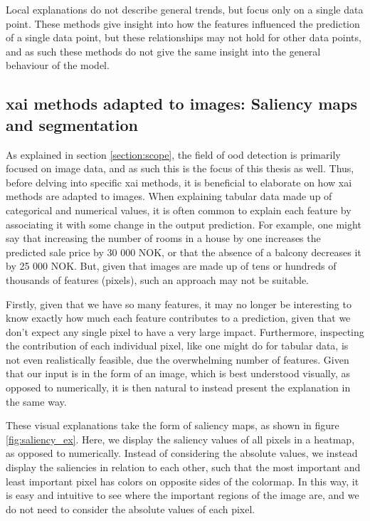 \documentclass[UKenglish]{uiomasterthesis} %
\theoremstyle{definition}
\begin{document}
Local explanations do not describe general trends, but focus only on a single data point. These methods give insight into how the features influenced the prediction of a single data point, but these relationships may not hold for other data points, and as such these methods do not give the same insight into the general behaviour of the model.

%

\subsection{\ac{xai} methods adapted to images: Saliency maps and segmentation}


As explained in section \ref{section:scope}, the field of \ac{ood} detection is primarily focused on image data, and as such this is the focus of this thesis as well. Thus, before delving into specific \ac{xai} methods, it is beneficial to elaborate on how \ac{xai} methods are adapted to images. When explaining tabular data made up of categorical and numerical values, it is often common to explain each feature by associating it with some change in the output prediction. For example, one might say that increasing the number of rooms in a house by one increases the predicted sale price by 30 000 NOK, or that the absence of a balcony decreases it by 25 000 NOK. But, given that images are made up of tens or hundreds of thousands of features (pixels), such an approach may not be suitable.

Firstly, given that we have so many features, it may no longer be interesting to know exactly how much each feature contributes to a prediction, given that we don't expect any single pixel to have a very large impact. Furthermore, inspecting the contribution of each individual pixel, like one might do for tabular data, is not even realistically feasible, due the overwhelming number of features. Given that our input is in the form of an image, which is best understood visually, as opposed to numerically, it is then natural to instead present the explanation in the same way.

These visual explanations take the form of saliency maps, as shown in figure \ref{fig:saliency_ex}. Here, we display the saliency values of all pixels in a heatmap, as opposed to numerically. Instead of considering the absolute values, we instead display the saliencies in relation to each other, such that the most important and least important pixel has colors on opposite sides of the colormap. In this way, it is easy and intuitive to see where the important regions of the image are, and we do not need to consider the absolute values of each pixel.
\end{document}
